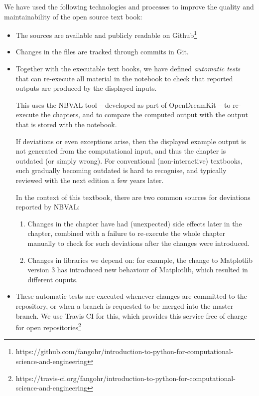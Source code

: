 \documentclass{deliverablereport}
\begin{document}
We have used the following technologies and processes to improve the
quality and maintainability of the open source text book:
\begin{itemize}
\item The sources are available and publicly readable on Github\footnote{https://github.com/fangohr/introduction-to-python-for-computational-science-and-engineering}
\item Changes in the files are tracked through commits in Git.
\item Together with the executable text books, we have defined
  \emph{automatic tests} that can re-execute all material in the
  notebook to check that reported outputs are produced by the
  displayed inputs.

  This uses the NBVAL tool -- developed as part of OpenDreamKit -- to
  re-execute the chapters, and to compare the computed output with the
  output that is stored with the notebook.

  If deviations or even exceptions arise, then the displayed example
  output is not generated from the computational input, and thus the
  chapter is outdated (or simply wrong). For conventional
  (non-interactive) textbooks, such gradually becoming outdated is
  hard to recognise, and typically reviewed with the next edition a
  few years later.

  In the context of this textbook, there are two common sources for
  deviations reported by NBVAL:
  \begin{enumerate}
  \item Changes in the chapter have had (unexpected) side effects
    later in the chapter, combined with a failure to re-execute the
    whole chapter manually to check for such deviations after the
    changes were introduced.
  \item Changes in libraries we depend on: for example, the change to
    Matplotlib version 3 has introduced new behaviour of Matplotlib,
    which resulted in different ouputs.
    \end{enumerate}



\item These automatic tests are executed whenever changes are
  committed to the repository, or when a branch is requested to be
  merged into the master branch. We use Travis CI for this, which
  provides this service free of charge for open repositories\footnote{
  https://travis-ci.org/fangohr/introduction-to-python-for-computational-science-and-engineering}


\end{itemize}
\end{document}
